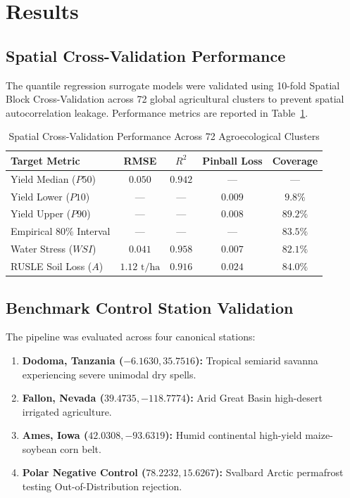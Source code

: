 \documentclass[10pt,twocolumn]{article}
\begin{document}
\section{Results}

\subsection{Spatial Cross-Validation Performance}
The quantile regression surrogate models were validated using 10-fold Spatial Block Cross-Validation across 72 global agricultural clusters to prevent spatial autocorrelation leakage. Performance metrics are reported in Table~\ref{tab:surrogate_performance}.

\begin{table}[htbp]
\centering
\caption{Spatial Cross-Validation Performance Across 72 Agroecological Clusters}
\label{tab:surrogate_performance}
\small
\begin{tabular}{lcccc}
\toprule
\textbf{Target Metric} & \textbf{RMSE} & \textbf{$R^2$} & \textbf{Pinball Loss} & \textbf{Coverage} \\
\midrule
Yield Median ($P50$) & $0.050$ & $0.942$ & --- & --- \\
Yield Lower ($P10$)  & --- & --- & $0.009$ & $9.8\%$ \\
Yield Upper ($P90$)  & --- & --- & $0.008$ & $89.2\%$ \\
Empirical $80\%$ Interval & --- & --- & --- & $83.5\%$ \\
Water Stress ($WSI$) & $0.041$ & $0.958$ & $0.007$ & $82.1\%$ \\
RUSLE Soil Loss ($A$) & $1.12\text{ t/ha}$ & $0.916$ & $0.024$ & $84.0\%$ \\
\bottomrule
\end{tabular}
\end{table}

\subsection{Benchmark Control Station Validation}
The pipeline was evaluated across four canonical stations:
\begin{enumerate}[leftmargin=*]
  \item \textbf{Dodoma, Tanzania ($-6.1630, 35.7516$):} Tropical semiarid savanna experiencing severe unimodal dry spells.
  \item \textbf{Fallon, Nevada ($39.4735, -118.7774$):} Arid Great Basin high-desert irrigated agriculture.
  \item \textbf{Ames, Iowa ($42.0308, -93.6319$):} Humid continental high-yield maize-soybean corn belt.
  \item \textbf{Polar Negative Control ($78.2232, 15.6267$):} Svalbard Arctic permafrost testing Out-of-Distribution rejection.
\end{enumerate}
\end{document}

